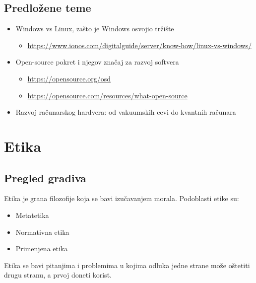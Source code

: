 \documentclass[a4paper,12pt]{article}
\begin{document}
\subsection{Predložene teme}
\begin{itemize}
    \item Windows vs Linux, zašto je Windows osvojio tržište
    \begin{itemize}
        \item \small{\href{https://www.ionos.com/digitalguide/server/know-how/linux-vs-windows/}{https://www.ionos.com/digitalguide/server/know-how/linux-vs-windows/}}
    \end{itemize}
    \item Open-source pokret i njegov značaj za razvoj softvera
    \begin{itemize}
        \item \small{\href{https://opensource.org/osd}{https://opensource.org/osd}}
        \item \small{\href{https://opensource.com/resources/what-open-source}{https://opensource.com/resources/what-open-source}} 
    \end{itemize}
    \item Razvoj računarskog hardvera: od vakuumskih cevi do kvantnih računara
\end{itemize}

\section{Etika}
\subsection{Pregled gradiva}
Etika je grana filozofije koja se bavi izučavanjem morala. Podoblasti etike su:
\begin{itemize}
    \item Metatetika
    \item Normativna etika
    \item Primenjena etika
\end{itemize}

Etika se bavi pitanjima i problemima u kojima odluka jedne strane može oštetiti drugu stranu, a prvoj doneti korist. 
\end{document}
